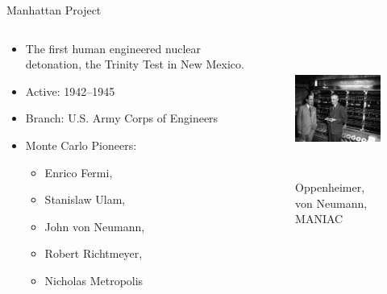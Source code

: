 \documentclass[xcolor=x11names,compress]{beamer}
\renewcommand{\(}{\begin{columns}}
\renewcommand{\)}{\end{columns}}
\newcommand{\<}[1]{\begin{column}{#1}}
\renewcommand{\>}{\end{column}}
\begin{document}
\begin{frame}{Manhattan Project}

\begin{columns}
  \begin{column}{0.5\textwidth}
    \begin{itemize}
    \item The first human engineered nuclear detonation, 
    the Trinity Test in New Mexico.
    \item Active: 1942–1945
    \item Branch: U.S. Army Corps of Engineers
    \item Monte Carlo Pioneers:
    \begin{itemize}
      \item Enrico Fermi,
      \item Stanislaw Ulam,
      \item John von Neumann, 
      \item Robert Richtmeyer, 
      \item Nicholas Metropolis
    \end{itemize}
    \end{itemize}
  \end{column}
  \begin{column}{0.5\textwidth}
  	\begin{figure}
  	\begin{center}
  		\includegraphics[height=1.75in,clip]{OppieNeumannMANIAC}
  		\caption{Oppenheimer, von Neumann, MANIAC}
	\end{center}
  	\end{figure}
  \end{column}
\end{columns}
\end{frame}
\end{document}

